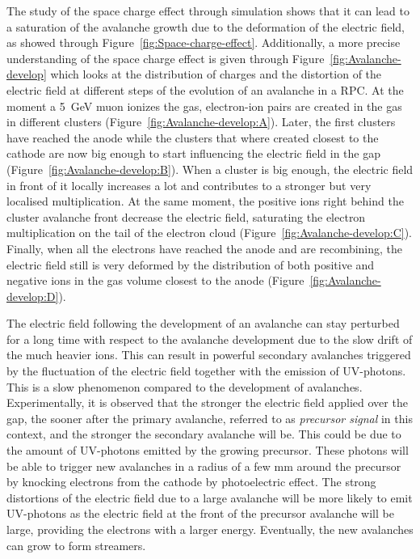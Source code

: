 	The study of the space charge effect through simulation shows that it can lead to a saturation of the avalanche growth due to the deformation of the electric field, as showed through Figure~\ref{fig:Space-charge-effect}. Additionally, a more precise understanding of the space charge effect is given through Figure~\ref{fig:Avalanche-develop} which looks at the distribution of charges and the distortion of the electric field at different steps of the evolution of an avalanche in a RPC. At the moment a \SI{5}{GeV} muon ionizes the gas, electron-ion pairs are created in the gas in different clusters (Figure~\ref{fig:Avalanche-develop:A}). Later, the first clusters have reached the anode while the clusters that where created closest to the cathode are now big enough to start influencing the electric field in the gap (Figure~\ref{fig:Avalanche-develop:B}). When a cluster is big enough, the electric field in front of it locally increases a lot and contributes to a stronger but very localised multiplication. At the same moment, the positive ions right behind the cluster avalanche front decrease the electric field, saturating the electron multiplication on the tail of the electron cloud (Figure~\ref{fig:Avalanche-develop:C}). Finally, when all the electrons have reached the anode and are recombining, the electric field still is very deformed by the distribution of both positive and negative ions in the gas volume closest to the anode (Figure~\ref{fig:Avalanche-develop:D}).
	
	The electric field following the development of an avalanche can stay perturbed for a long time with respect to the avalanche development due to the slow drift of the much heavier ions. This can result in powerful secondary avalanches triggered by the fluctuation of the electric field together with the emission of UV-photons. This is a slow phenomenon compared to the development of avalanches. Experimentally, it is observed that the stronger the electric field applied over the gap, the sooner after the primary avalanche, referred to as \textit{precursor signal} in this context, and the stronger the secondary avalanche will be. This could be due to the amount of UV-photons emitted by the growing precursor. These photons will be able to trigger new avalanches in a radius of a few \si{mm} around the precursor by knocking electrons from the cathode by photoelectric effect. The strong distortions of the electric field due to a large avalanche will be more likely to emit UV-photons as the electric field at the front of the precursor avalanche will be large, providing the electrons with a larger energy. Eventually, the new avalanches can grow to form streamers.
	
